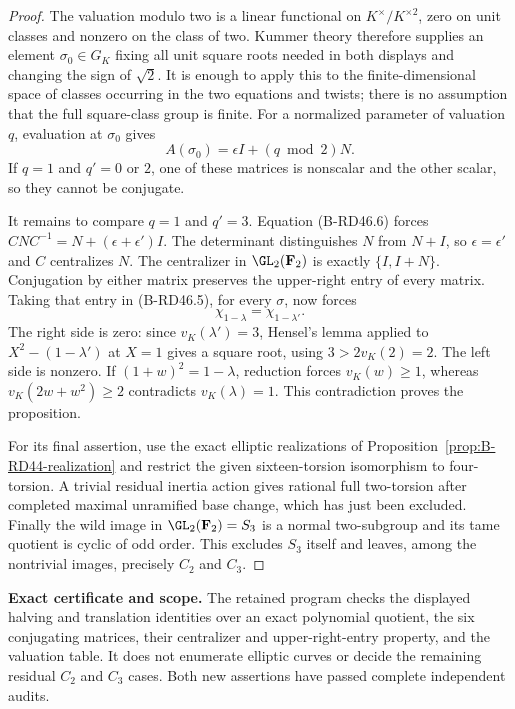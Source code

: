 \begin{proof}
The valuation modulo two is a linear functional on
$K^\times/K^{\times2}$, zero on unit classes and nonzero on
the class of two. Kummer theory therefore supplies an element
$\sigma_0\in G_K$ fixing all unit square roots needed in both
displays and changing the sign of $\sqrt2$.
It is enough to apply this to the finite-dimensional space of
classes occurring in the two equations and twists; there is no
assumption that the full square-class group is finite.
For a normalized parameter of valuation $q$, evaluation at
$\sigma_0$ gives
\[
                       A(\sigma_0)=\epsilon I+(q\bmod2)N.
                                                               \tag{B-RD46.6}
\]
If $q=1$ and $q'=0$ or $2$, one of these matrices is nonscalar
and the other scalar, so they cannot be conjugate.

It remains to compare $q=1$ and $q'=3$.
Equation (B-RD46.6) forces
$CNC^{-1}=N+(\epsilon+\epsilon')I$.
The determinant distinguishes $N$ from $N+I$, so
$\epsilon=\epsilon'$ and $C$ centralizes $N$.
The centralizer in $\GL_2(\mathbf F_2)$ is exactly
$\{I,I+N\}$. Conjugation by either matrix preserves the
upper-right entry of every matrix. Taking that entry in
(B-RD46.5), for every $\sigma$, now forces
\[
                         \chi_{1-\lambda}
                              =\chi_{1-\lambda'}.       \tag{B-RD46.7}
\]
The right side is zero: since $v_K(\lambda')=3$,
Hensel's lemma applied to $X^2-(1-\lambda')$ at $X=1$
gives a square root, using $3>2v_K(2)=2$.
The left side is nonzero. If $(1+w)^2=1-\lambda$, reduction
forces $v_K(w)\ge1$, whereas
$v_K(2w+w^2)\ge2$ contradicts $v_K(\lambda)=1$.
This contradiction proves the proposition.

For its final assertion, use the exact elliptic realizations
of Proposition~\ref{prop:B-RD44-realization} and restrict the
given sixteen-torsion isomorphism to four-torsion. A trivial
residual inertia action gives rational full two-torsion after
completed maximal unramified base change, which has just been
excluded. Finally the wild image in $\GL_2(\mathbf F_2)=S_3$
is a normal two-subgroup and its tame quotient is cyclic of
odd order. This excludes $S_3$ itself and leaves, among the
nontrivial images, precisely $C_2$ and $C_3$.
\end{proof}

\par\smallskip\noindent\textbf{Exact certificate and scope.}
The retained program
checks the displayed halving and translation identities over an
exact polynomial quotient, the six conjugating matrices, their
centralizer and upper-right-entry property, and the valuation
table. It does not enumerate elliptic curves or decide the
remaining residual $C_2$ and $C_3$ cases. Both new assertions have passed complete independent audits.

